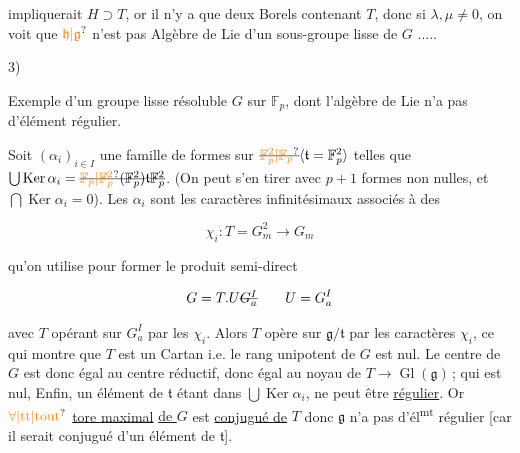 
impliquerait $H\supset T$,
 or il n'y a que deux Borels
contenant $T$,  donc si $\lambda,\mu\ne0$, on
voit que $\unsure{\mathfrak h|\mathfrak g}$ n'est pas Algèbre de Lie d'un sous-groupe lisse de $G$ .....

3)


Exemple d'un groupe lisse résoluble  $G$ sur $\mathbb F_p$,  dont l'algèbre
de Lie n'a pas d'élément régulier.

Soit $(\alpha_i)_{i\in I}$ une famille  de formes  sur $\deleted{\unsure{\mathbb F_p^2|\mathbb F_p}}\inserted{\mathfrak t=\mathbb F_p^2}$ telles que
$\bigcup\operatorname{Ker}\alpha_i=\deleted{\unsure{\mathbb F_p|\mathbb F_p^2}(\mathbb F_p^2)}\mathfrak t\deleted{\mathbb F_p^2}$. (On peut s'en tirer
avec $p+1$ formes non nulles, et $\bigcap\operatorname{Ker}\alpha_i=0$). 
Les $\alpha_i$ sont les caractères infinitésimaux associés
à des 

\[
\chi_i:T=G_m^2\longrightarrow G_m
\]

qu'on utilise pour former le produit semi-direct

\[
G=T.U\deleted{G_a^I}\qquad U=G_a^I
\]

avec $T$ opérant sur $G_a^I$ par les $\chi_i$.
Alors $T$ opère sur $\mathfrak g/\mathfrak t$ par les caractères
$\chi_i$, ce qui montre que $T$ est un Cartan
i.e. le rang unipotent de $G$ est nul. Le
centre de $G$ est donc égal au centre réductif, donc
égal au noyau de $T\longrightarrow\operatorname{Gl}(\mathfrak g)$\,; qui est
nul,  Enfin, un  élément
 de $\mathfrak t$  étant dans
$\bigcup\operatorname{Ker}\alpha_i$, ne peut être \uline{régulier}. Or \uline{$\unsure{\forall|\text{tt}|\text{tout}}$}
\uline{tore maximal} \uline{de $G$} est \uline{conjugué de} $T$
\deleted{\unsure{[comme|comme}} \inserted{(par un élément unique de $U(\mathbb F_p)$]} donc
 $\mathfrak g$ n'a pas d'él\textsuperscript{mt} régulier [car
il serait conjugué d'un élément de $\mathfrak t$].

